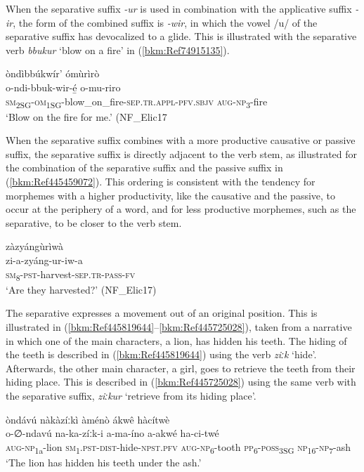 When the separative suffix \textit{-ur} is used in combination with the applicative suffix \textit{\nobreakdash-ir}, the form of the combined suffix is \textit{-wir}, in which the vowel /u/ of the separative suffix has devocalized to a glide. This is illustrated with the separative verb \textit{bbukur} ‘blow on a fire’ in (\ref{bkm:Ref74915135}).

\ea
\label{bkm:Ref74915135}
\glll òndìbbúkwír’ ómùrìrò\\
o-ndi-bbuk-wir-é̲            o-mu-riro\\
\textsc{sm}\textsubscript{2SG}-\textsc{om}\textsubscript{1SG}-blow\_on\_fire-\textsc{sep}.\textsc{tr}.\textsc{appl}-\textsc{pfv}.\textsc{sbjv}  \textsc{aug}-\textsc{np}\textsubscript{3}-fire\\
\glt ‘Blow on the fire for me.’ (NF\_Elic17
\z

When the separative suffix combines with a more productive causative or passive suffix, the separative suffix is directly adjacent to the verb stem, as illustrated for the combination of the separative suffix and the passive suffix in (\ref{bkm:Ref445459072}). This ordering is consistent with the tendency for morphemes with a higher productivity, like the causative and the passive, to occur at the periphery of a word, and for less productive morphemes, such as the separative, to be closer to the verb stem.

\ea
\label{bkm:Ref445459072}
\glll zàzyángùrìwà\\
zi-a-zyáng-ur-iw-a\\
\textsc{sm}\textsubscript{8}-\textsc{pst}-harvest-\textsc{sep}.\textsc{tr}-\textsc{pass}-\textsc{fv}\\
\glt ‘Are they harvested?’ (NF\_Elic17)
\z

The separative expresses a movement out of an original position. This is illustrated in (\ref{bkm:Ref445819644}--\ref{bkm:Ref445725028}), taken from a narrative in which one of the main characters, a lion, has hidden his teeth. The hiding of the teeth is described in (\ref{bkm:Ref445819644}) using the verb \textit{ziːk} ‘hide’. Afterwards, the other main character, a girl, goes to retrieve the teeth from their hiding place. This is described in (\ref{bkm:Ref445725028}) using the same verb with the separative suffix, \textit{ziːkur} ‘retrieve from its hiding place’.

\ea
\label{bkm:Ref445819644}
òndávú nàkàzíːkì àménò ákwê hàcítwè\\
\gll o-∅-ndavú    na-ka-zíːk-i a-ma-íno    a-akwé   ha-ci-twé \\
\textsc{aug}-\textsc{np}\textsubscript{1a}-lion  \textsc{sm}\textsubscript{1}.\textsc{pst}-\textsc{dist}-hide-\textsc{npst}.\textsc{pfv}
\textsc{aug}-\textsc{np}\textsubscript{6}-tooth  \textsc{pp}\textsubscript{6}-\textsc{poss}\textsubscript{3SG} \textsc{np}\textsubscript{16}-\textsc{np}\textsubscript{7}-ash\\
\glt ‘The lion has hidden his teeth under the ash.’
\z


